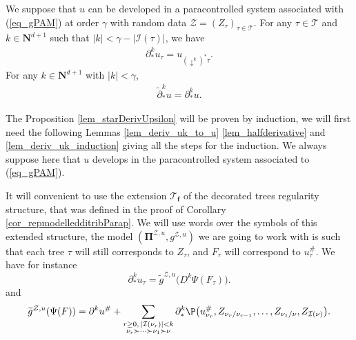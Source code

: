 \documentclass[11pt]{preprint}
\newcommand{\mcI}{\mathcal{I}}
\newcommand{\mcZ}{\mathcal{Z}}
\newcommand{\mcT}{\mathcal{T}}
\def\PPi{\boldsymbol{\Pi}}
\def\eqref#1{(\ref{#1})}
\newcommand{\bfN}{\mathbf{N}}
\newcommand{\scrT}{\mathscr{T}}
\begin{document}
	\begin{proposition}\label{lem_starDerivUpsilon}
		We suppose that $u$ can be developed in a paracontrolled system associated with \eqref{eq_gPAM} at order $\gamma$ with random data $\mcZ=(Z_\tau)_{\tau\in\mcT}$. For any $\tau\in\mcT$ and $k\in\bfN^{d+1}$ such that $|k| < \gamma-|\mcI(\tau)|$, we have
		\begin{equation}\label{eq_starPartialUTau} \begin{split}
			\partial_*^ku_\tau= u_{(\downarrow^k)^* \tau}.
		\end{split}\end{equation}
	For any $k\in\bfN^{d+1}$ with $|k|<\gamma$, 
	\begin{equation}\label{eq_starPartialU} \begin{split}
			\widetilde\partial^k_{*}u = \partial^k_* u.
	\end{split}\end{equation}
	\end{proposition}
	
	
The Proposition \ref{lem_starDerivUpsilon} will be proven by induction, we will first need the following Lemmas \ref{lem_deriv_uk_to_u} \ref{lem_halfderivative} and \ref{lem_deriv_uk_induction} giving all the steps for the induction. We always suppose here that $u$ develops in the paracontrolled system associated to \eqref{eq_gPAM}.
	
	It will convenient to use the extension $\scrT_{\bm f}$ of the decorated trees regularity structure, that was defined in the proof of Corollary \ref{cor_repmodelledditribParap}. We will use words over the symbols of this extended structure, the model $(\PPi^{\mcZ,u},g^{\mcZ,u})$ we are going to work with is such that each tree $\tau$ will still corresponds to $Z_\tau$, and $F_{\tau}$ will correspond to $u_\tau^\#$. We have for instance 
$$
\partial^k_*u_\tau = \widetilde{g}^{\mcZ,u}\big(D^k\Psi(F_\tau)\big).
$$
and 
$$
\widetilde{g}^{\mcZ,u}(\Psi(F))=\partial^k u^{\#} + \sum_{\substack{r\geq 0, \, |\mcI(\nu_r)|<k \\ \nu_r\succ\dots\succ\nu_1\succ\nu}}\partial^k_*\P\big(u_{\nu_r}^\#, Z_{\nu_r/\nu_{r-1}},\dots,Z_{\nu_1/\nu}, Z_{\mcI(\nu)}\big).
$$
		
		
		
		
		
\end{document}
